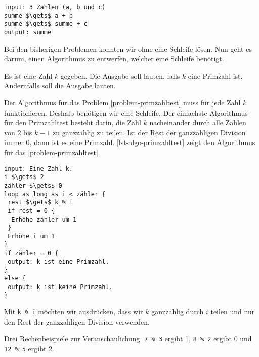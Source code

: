 \begin{lstlisting}[language=pseudocode, caption={Auf der rechten Seite von $\gets$ in Zeile \num{3} wird in der Variablen \lstinline{summe} der Wert aus der vorherigen Zeile gespeichert. Erst nach der Addition wird das Ergebnis in \lstinline{summe} gespeichert.}, label={lst-algo-addition-3-zahlen}]
input: 3 Zahlen (a, b und c)
summe $\gets$ a + b
summe $\gets$ summe + c
output: summe
\end{lstlisting}

Bei den bisherigen Problemen konnten wir ohne eine Schleife lösen. Nun geht es darum, einen Algorithmus zu entwerfen, welcher eine Schleife benötigt.

\begin{problem}[Primzahltest]\label{problem-primzahltest}
	Es ist eine Zahl $k$ gegeben. Die Ausgabe soll  lauten, falls $k$ eine Primzahl ist. Andernfalls soll die Ausgabe  lauten.
\end{problem}

Der Algorithmus für das Problem \autoref{problem-primzahltest}  muss für jede Zahl $k$ funktionieren. Deshalb benötigen wir eine Schleife. Der einfachste Algorithmus für den Primzahltest besteht darin, die Zahl $k$ nacheinander durch alle Zahlen von $2$ bis $k - 1$ zu ganzzahlig zu teilen. Ist der Rest der ganzzahligen Division immer $0$, dann ist es eine Primzahl. \autoref{lst-algo-primzahltest} zeigt den Algorithmus für das \autoref{problem-primzahltest}.

\begin{lstlisting}[language=pseudocode, caption={Algorithmus für das Problem \protect\autoref{problem-primzahltest} mit einer Schleife.}, label={lst-algo-primzahltest}]
input: Eine Zahl k.
i $\gets$ 2
zähler $\gets$ 0
loop as long as i < zähler {
 rest $\gets$ k % i
 if rest = 0 {
  Erhöhe zähler um 1
 }
 Erhöhe i um 1
}
if zähler = 0 {
 output: k ist eine Primzahl.
}
else {
 output: k ist keine Primzahl.
}
\end{lstlisting}

Mit \protect\lstinline[language=pseudocode]{k % i} möchten wir ausdrücken, dass wir $k$ ganzzahlig durch $i$ teilen und nur den Rest der ganzzahligen Division verwenden.

\begin{example}
Drei Rechenbeispiele zur Veranschaulichung: \protect\lstinline[language=pseudocode]{7 % 3} ergibt 1, \protect\lstinline[language=pseudocode]{8 % 2} ergibt 0 und \protect\lstinline[language=pseudocode]{12 % 5} ergibt 2.
\end{example}


